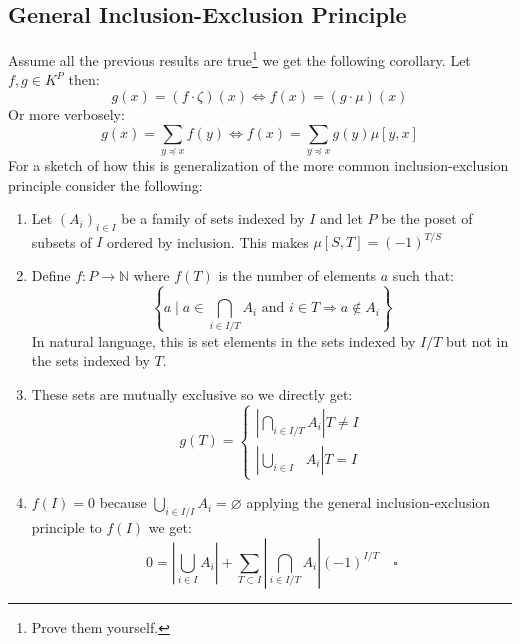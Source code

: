 \subsection{General Inclusion-Exclusion Principle}
Assume all the previous results are true\footnote{Prove them yourself.} we get the following corollary.
Let $f,g\in K^P$ then:
\[g(x) = (f\cdot \zeta)(x) \Leftrightarrow f(x) = (g\cdot \mu)(x)\]
Or more verbosely:
\[g(x) = \sum_{y\preceq x}f(y) \Leftrightarrow f(x) = \sum_{y\preceq x}g(y)\mu[y,x]\]
For a sketch of how this is generalization of the more common inclusion-exclusion principle consider the following:
\begin{enumerate}
	\item Let $(A_i)_{i\in I}$ be a family of sets indexed by $I$ and let $P$ be the poset of subsets of $I$ ordered by inclusion.
	This makes $\mu[S,T] = (-1)^{T/S}$
	\item Define $f:P\rightarrow \mathbb{N}$ where $f(T)$ is the number of elements $a$ such that:
		\[\left\{a\mid a \in \bigcap_{i\in I/T}A_i \text{ and } i\in T \Rightarrow a\not\in A_i \right\}\]
	In natural language, this is set elements in the sets indexed by $I/T$ but not in the sets indexed by $T$.
	\item These sets are mutually exclusive so we directly get:
		\[g(T)=\begin{cases}\left|\bigcap_{i\in I/T}A_i\right| T\neq I\\\left|\bigcup_{i\in I\phantom{/I}}A_i\right|T=I\end{cases}\]
	\item $f(I)=0$ because $\bigcup_{i\in I/I}A_i = \varnothing$ applying the general inclusion-exclusion principle to $f(I)$ we get: 
		\[0=\left|\bigcup_{i\in I}A_i\right|+\sum_{T\subset I}\left|\bigcap_{i\in I/T}A_i\right|(-1)^{I/T}\quad\square\]
\end{enumerate}
